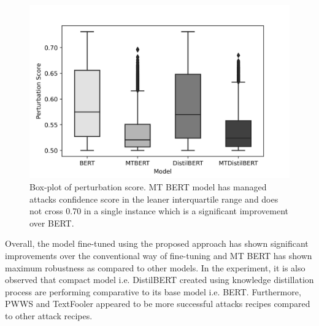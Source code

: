 \documentclass[%
	BCOR=8mm, %
	DIV=12,
	toc=bibliography, %
	toc=listof, %
	oneside, %
	egregdoesnotlikesansseriftitles, %
	]{scrbook}
\begin{document}
\begin{figure}[H]
    \centering
    \includegraphics[width=.57\linewidth]{img/PertScoreDist}
    \caption[Box-plot of perturbation score]{\small Box-plot of perturbation score. MT BERT model has managed attacks confidence score in the leaner interquartile range and does not cross 0.70 in a single instance which is a significant improvement over BERT.}
    \label{fig:pertscoredist}
\end{figure}
 Overall, the model fine-tuned using the proposed approach has shown significant improvements over the conventional way of fine-tuning and MT BERT has shown maximum robustness as compared to other models. In the experiment, it is also observed that compact model i.e. DistilBERT created using knowledge distillation process are performing comparative to its base model i.e. BERT. Furthermore, PWWS and TextFooler appeared to be more successful attacks recipes compared to other attack recipes. 

\end{document}
